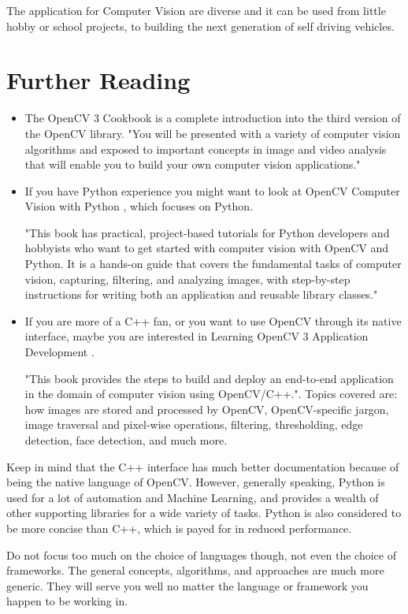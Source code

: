 \documentclass[12pt, a4paper]{article}
\begin{document}
The application for Computer Vision are diverse and it can be used from little hobby or school projects, to building the next generation of self driving vehicles.

\section{Further Reading}
\begin{itemize}
	\item The OpenCV 3 Cookbook \cite{openCVCookbook} is a complete introduction into the third version of the OpenCV library. "You will be presented with a variety of computer vision algorithms and exposed to important concepts in image and video analysis that will enable you to build your own computer vision applications." \cite{openCVCookbookWebsite}

	\item If you have Python experience you might want to look at OpenCV Computer Vision with Python \cite{openCVPython}, which focuses on Python.

	"This book has practical, project-based tutorials for Python developers and hobbyists who want to get started with computer vision with OpenCV and Python. It is a hands-on guide that covers the fundamental tasks of computer vision, capturing, filtering, and analyzing images, with step-by-step instructions for writing both an application and reusable library classes." \cite{openCVPythonWebsite}

	\item If you are more of a C++ fan, or you want to use OpenCV through its native interface, maybe you are interested in Learning OpenCV 3 Application Development \cite{openCVApplicationDevelopment}.

	"This book provides the steps to build and deploy an end-to-end application in the domain of computer vision using OpenCV/C++.". Topics covered are: how images are stored and processed by OpenCV, OpenCV-specific jargon, image traversal and pixel-wise operations, filtering, thresholding, edge detection, face detection, and much more. \cite{openCVApplicationDevelopmentWebsite}
\end{itemize}

Keep in mind that the C++ interface has much better documentation because of being the native language of OpenCV. However, generally speaking, Python is used for a lot of automation and Machine Learning, and provides a wealth of other supporting libraries for a wide variety of tasks. Python is also considered to be more concise than C++, which is payed for in reduced performance.

Do not focus too much on the choice of languages though, not even the choice of frameworks. The general concepts, algorithms, and approaches are much more generic. They will serve you well no matter the language or framework you happen to be working in.

\printbibliography
\end{document}

